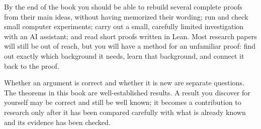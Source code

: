 By the end of the book you should be able to rebuild several complete proofs from their main ideas, without having memorized their wording; run and check small computer experiments; carry out a small, carefully limited investigation with an AI assistant; and read short proofs written in Lean. Most research papers will still be out of reach, but you will have a method for an unfamiliar proof: find out exactly which background it needs, learn that background, and connect it back to the proof.

Whether an argument is correct and whether it is new are separate questions. The theorems in this book are well-established results. A result you discover for yourself may be correct and still be well known; it becomes a contribution to research only after it has been compared carefully with what is already known and its evidence has been checked.

